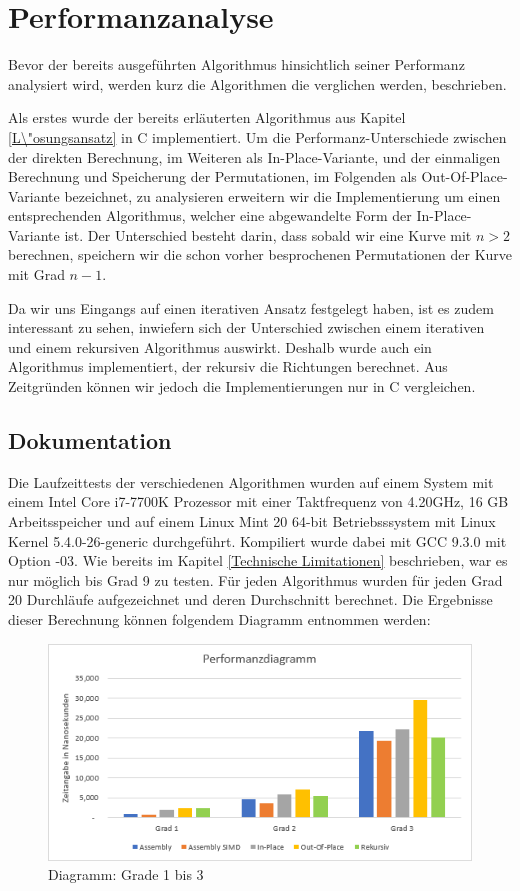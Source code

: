 \documentclass[course=asp]{aspdoc}
\begin{document}
\section{Performanzanalyse} \label{Performanzanalyse}
Bevor der bereits ausgef\"uhrten Algorithmus hinsichtlich seiner Performanz analysiert wird, werden kurz die Algorithmen die verglichen werden, beschrieben.

Als erstes wurde der bereits erl\"auterten Algorithmus aus Kapitel \ref{L\"osungsansatz} in C implementiert. Um die Performanz-Unterschiede zwischen der direkten Berechnung, im Weiteren als In-Place-Variante, und der einmaligen Berechnung und Speicherung der Permutationen, im Folgenden als Out-Of-Place-Variante bezeichnet, zu analysieren erweitern wir die Implementierung um einen entsprechenden Algorithmus, welcher eine abgewandelte Form der In-Place-Variante ist. Der Unterschied besteht darin, dass sobald wir eine Kurve mit $n > 2$ berechnen, speichern wir die schon vorher besprochenen Permutationen der Kurve mit Grad $n - 1$. 

Da wir uns Eingangs auf einen iterativen Ansatz festgelegt haben, ist es zudem interessant zu sehen, inwiefern sich der Unterschied zwischen einem iterativen und einem rekursiven Algorithmus auswirkt. Deshalb wurde auch ein Algorithmus implementiert, der rekursiv die Richtungen berechnet. Aus Zeitgr\"unden k\"onnen wir jedoch die Implementierungen nur in C vergleichen. 

\subsection{Dokumentation}

Die Laufzeittests der verschiedenen Algorithmen wurden auf einem System mit einem Intel Core i7-7700K Prozessor mit einer Taktfrequenz von 4.20GHz, 16 GB Arbeitsspeicher und auf einem Linux Mint 20 64-bit Betriebsssystem mit Linux Kernel 5.4.0-26-generic durchgef\"uhrt. Kompiliert wurde dabei mit GCC 9.3.0 mit Option -03.
Wie bereits im Kapitel \ref{Technische Limitationen} beschrieben, war es nur m\"oglich bis Grad 9 zu testen.
F\"ur jeden Algorithmus wurden f\"ur jeden Grad 20 Durchl\"aufe aufgezeichnet und deren Durchschnitt berechnet. Die Ergebnisse dieser Berechnung k\"onnen folgendem Diagramm entnommen werden:

\begin{figure}[ht]
\centering
\includegraphics[scale = 0.65]{diagramm1bis3.png}
\caption{Diagramm: Grade 1 bis 3}\label{Abb: Diagramm Performanz}
\captionsetup[figure]{font=small,labelfont=small}
\end{figure}
\end{document}
